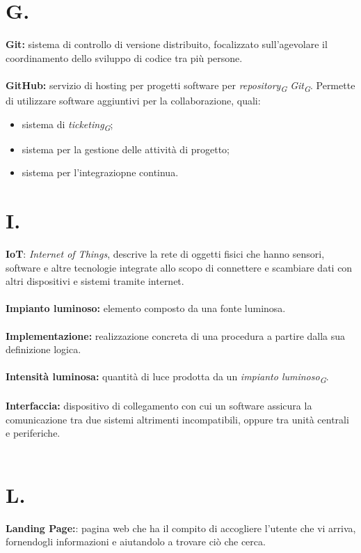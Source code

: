 \documentclass[a4paper, 12pt]{article}
\begin{document}
\newpage
\section{G.}
\textbf{Git:} sistema di controllo di versione distribuito, focalizzato
sull'agevolare il coordinamento dello sviluppo di codice tra più persone. \\ \\
\textbf{GitHub:} servizio di hosting per progetti software per
\textit{repository\textsubscript{G}} \textit{Git\textsubscript{G}}. Permette di
utilizzare software aggiuntivi per la collaborazione, quali:
\begin{itemize}
    \item sistema di \textit{ticketing\textsubscript{G}};
    \item sistema per la gestione delle attività di progetto;
    \item sistema per l'integraziopne continua.
\end{itemize} 
\newpage

\section{I.}
\textbf{IoT}: \textit{Internet of Things}, descrive la rete di oggetti fisici che hanno sensori, software e altre tecnologie integrate allo scopo di connettere e scambiare dati con altri dispositivi e sistemi tramite internet. \\ \\
\textbf{Impianto luminoso:} elemento composto da una fonte luminosa. \\ \\
\textbf{Implementazione:} realizzazione concreta di una procedura a partire dalla sua definizione logica. \\ \\
\textbf{Intensità luminosa:} quantità di luce prodotta da un \textit{impianto luminoso\textsubscript{G}}. \\ \\
\textbf{Interfaccia:} dispositivo di collegamento con cui un software assicura la comunicazione tra due sistemi altrimenti incompatibili, oppure tra unità centrali e periferiche. \\ \\

\newpage
\section{L.}
\textbf{Landing Page:}: pagina web che ha il compito di accogliere l'utente che vi arriva, fornendogli informazioni e aiutandolo a trovare ciò che cerca. \\ \\
\end{document}
